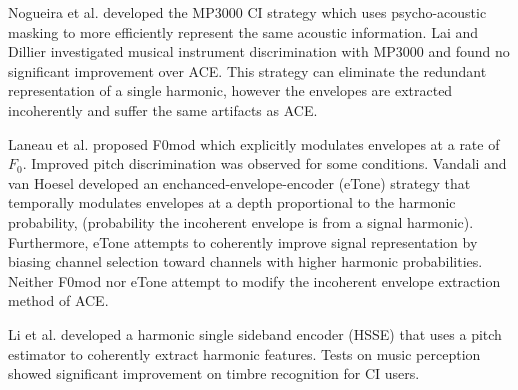 \documentclass [11pt, proquest,oneside] {ganter_thesis}[2015/03/03]
\begin{document}
Nogueira et al. \cite{nogueira2005psychoacoustic} developed the MP3000 CI strategy which uses psycho-acoustic masking to more efficiently represent the same acoustic information.  Lai and Dillier \cite{lai2008investigating} investigated musical instrument discrimination with MP3000 and found no significant improvement over ACE.  This strategy can eliminate the redundant representation of a single harmonic, however the envelopes are extracted incoherently and suffer the same artifacts as ACE.

Laneau et al. \cite{laneau2006improved} proposed F0mod which explicitly modulates envelopes at a rate of $F_0$.  Improved pitch discrimination was observed for some conditions.  Vandali and van Hoesel \cite{vandali2011development} developed an enchanced-envelope-encoder (eTone) strategy that temporally modulates envelopes at a depth proportional to the harmonic probability, (probability the incoherent envelope is from a signal harmonic).  Furthermore, eTone attempts to coherently improve signal representation by biasing channel selection toward channels with higher harmonic probabilities.  Neither F0mod nor eTone attempt to modify the incoherent envelope extraction method of ACE.

Li et al. \cite{li2010harmonic} developed a harmonic single sideband encoder (HSSE) that uses a pitch estimator to coherently extract harmonic features.  Tests on music perception \cite{li2013improved} showed significant improvement on timbre recognition for CI users.





\end{document}
